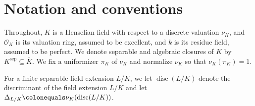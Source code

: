 \documentclass[12pt]{amsart}
\numberwithin{equation}{section}
\theoremstyle{definition}
\newcommand{\padma}[1]{{\color{Magenta} \sf $\clubsuit\clubsuit\clubsuit$ Padma: [#1]}}
\newcommand{\connor}[1]{{\color{Orange} \sf $\diamondsuit\diamondsuit\diamondsuit$ Connor: [#1]}}
\newcommand{\ol}[1]{\overline{#1}}
\newcommand{\mc}[1]{\mathcal{#1}}
\DeclareMathOperator{\disc}{disc}
\DeclareMathOperator{\sep}{sep}
\DeclareMathOperator{\Res}{Res}
\DeclareMathOperator{\rad}{rad}
\begin{document}

\section*{Notation and conventions}
Throughout, $K$ is a Henselian field with respect to a
discrete valuation $\nu_K$, and $\mc{O}_K$ is its valuation ring,
assumed to be excellent, and $k$ is its residue field, assumed to be perfect.  
We denote separable and algebraic
closures of $K$ by $K^{\sep} \subseteq \ol{K}$.
We fix a uniformizer $\pi_K$ of $\nu_K$
and normalize $\nu_K$ so that $\nu_K(\pi_K) = 1$.

For a finite separable field extension $L/K$, we let $\disc(L/K)$
denote the discriminant of the field extension $L/K$ and let
$\Delta_{L/K} \colonequals \nu_K(\disc(L/K))$. %
\end{document}
